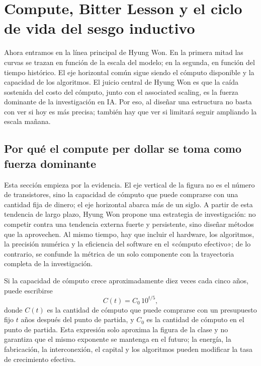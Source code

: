 \section{Compute, Bitter Lesson y el ciclo de vida del sesgo inductivo}

Ahora entramos en la línea principal de Hyung Won. En la primera mitad las curvas se trazan en función de la escala del modelo; en la segunda, en función del tiempo histórico. El eje horizontal común sigue siendo el cómputo disponible y la capacidad de los algoritmos. El juicio central de Hyung Won es que la caída sostenida del costo del cómputo, junto con el associated scaling, es la fuerza dominante de la investigación en IA. Por eso, al diseñar una estructura no basta con ver si hoy es más precisa; también hay que ver si limitará seguir ampliando la escala mañana.

\subsection{Por qué el compute per dollar se toma como fuerza dominante}

Esta sección empieza por la evidencia. El eje vertical de la figura no es el número de transistores, sino la capacidad de cómputo que puede comprarse con una cantidad fija de dinero; el eje horizontal abarca más de un siglo. A partir de esta tendencia de largo plazo, Hyung Won propone una estrategia de investigación: no competir contra una tendencia externa fuerte y persistente, sino diseñar métodos que la aprovechen. Al mismo tiempo, hay que incluir el hardware, los algoritmos, la precisión numérica y la eficiencia del software en el «cómputo efectivo»; de lo contrario, se confunde la métrica de un solo componente con la trayectoria completa de la investigación.


Si la capacidad de cómputo crece aproximadamente diez veces cada cinco años, puede escribirse
\[
C(t)=C_0\,10^{t/5},
\]
donde $C(t)$ es la cantidad de cómputo que puede comprarse con un presupuesto fijo $t$ años después del punto de partida, y $C_0$ es la cantidad de cómputo en el punto de partida. Esta expresión solo aproxima la figura de la clase y no garantiza que el mismo exponente se mantenga en el futuro; la energía, la fabricación, la interconexión, el capital y los algoritmos pueden modificar la tasa de crecimiento efectiva.

